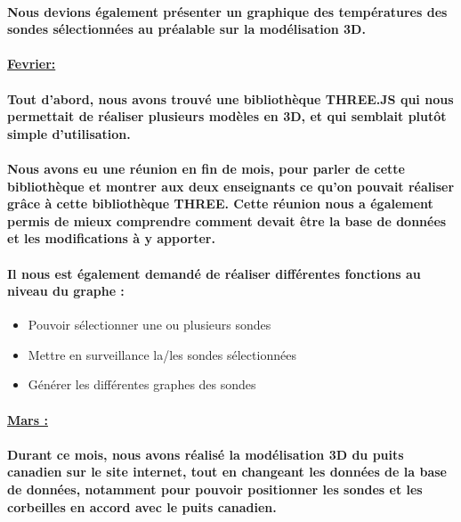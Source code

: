 \documentclass[12pt , a4paper,titlepage]{report}
\begin{document}
 \paragraph{   Nous devions également présenter un graphique des températures des sondes sélectionnées au préalable sur la modélisation
 3D.}

 \paragraph{\underline {Fevrier:}}
 \paragraph{   Tout d'abord, nous avons trouvé une bibliothèque THREE.JS qui nous permettait de réaliser plusieurs modèles en 3D, et qui
 semblait plutôt simple d'utilisation.}
 \paragraph{   Nous avons eu une réunion en fin de mois, pour parler de cette bibliothèque et montrer aux deux enseignants ce qu'on
 pouvait réaliser grâce à cette bibliothèque THREE. Cette réunion nous a également permis de mieux comprendre comment devait être la base
 de données et les modifications à y apporter.}
 \paragraph{ Il nous est également demandé de réaliser différentes fonctions au niveau du graphe :}
 \begin{itemize}
	\item Pouvoir sélectionner une ou plusieurs sondes
	\item Mettre en surveillance la/les sondes sélectionnées
	\item Générer les différentes graphes des sondes
 \end{itemize}
 
 \paragraph{\underline {Mars :}}
 \paragraph{ Durant ce mois, nous avons réalisé la modélisation 3D du puits canadien sur le site internet, tout en changeant les données
 de la base de données, notamment pour pouvoir positionner les sondes et les corbeilles en accord avec le puits canadien.}
\end{document}
